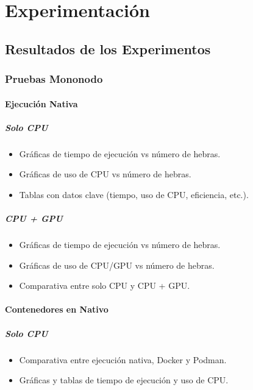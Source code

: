 \chapter{Experimentación}\label{cap:experimentacion}

\section{Resultados de los Experimentos}

\subsection{Pruebas Mononodo}
\subsubsection{Ejecución Nativa}
\paragraph{Solo CPU}
\begin{itemize}
    \item Gráficas de tiempo de ejecución vs número de hebras.
    \item Gráficas de uso de CPU vs número de hebras.
    \item Tablas con datos clave (tiempo, uso de CPU, eficiencia, etc.).
\end{itemize}
\paragraph{CPU + GPU}
\begin{itemize}
    \item Gráficas de tiempo de ejecución vs número de hebras.
    \item Gráficas de uso de CPU/GPU vs número de hebras.
    \item Comparativa entre solo CPU y CPU + GPU.
\end{itemize}
\subsubsection{Contenedores en Nativo}
\paragraph{Solo CPU}
\begin{itemize}
    \item Comparativa entre ejecución nativa, Docker y Podman.
    \item Gráficas y tablas de tiempo de ejecución y uso de CPU.
\end{itemize}
